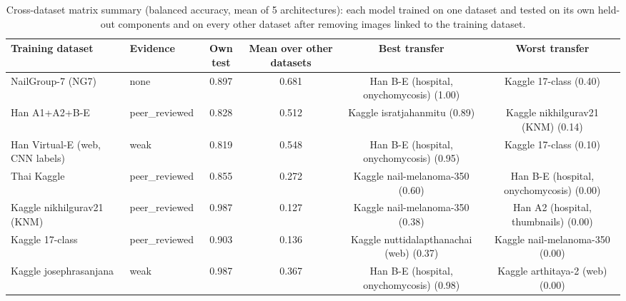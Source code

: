 \begin{table}[!tbp]
\centering
\caption{Cross-dataset matrix summary (balanced accuracy, mean of 5 architectures): each model trained on one dataset and tested on its own held-out components and on every other dataset after removing images linked to the training dataset.}
\label{tab:xsrcsummary}
\footnotesize
\begin{tabular}{llcccc}
\hline
Training dataset & Evidence & Own test & Mean over other datasets & Best transfer & Worst transfer \\
\hline
NailGroup-7 (NG7) & none & 0.897 & 0.681 & Han B-E (hospital, onychomycosis) (1.00) & Kaggle 17-class (0.40) \\
Han A1+A2+B-E & peer\_reviewed & 0.828 & 0.512 & Kaggle isratjahanmitu (0.89) & Kaggle nikhilgurav21 (KNM) (0.14) \\
Han Virtual-E (web, CNN labels) & weak & 0.819 & 0.548 & Han B-E (hospital, onychomycosis) (0.95) & Kaggle 17-class (0.10) \\
Thai Kaggle & peer\_reviewed & 0.855 & 0.272 & Kaggle nail-melanoma-350 (0.60) & Han B-E (hospital, onychomycosis) (0.00) \\
Kaggle nikhilgurav21 (KNM) & peer\_reviewed & 0.987 & 0.127 & Kaggle nail-melanoma-350 (0.38) & Han A2 (hospital, thumbnails) (0.00) \\
Kaggle 17-class & peer\_reviewed & 0.903 & 0.136 & Kaggle nuttidalapthanachai (web) (0.37) & Kaggle nail-melanoma-350 (0.00) \\
Kaggle josephrasanjana & weak & 0.987 & 0.367 & Han B-E (hospital, onychomycosis) (0.98) & Kaggle arthitaya-2 (web) (0.00) \\
\hline
\end{tabular}
\end{table}